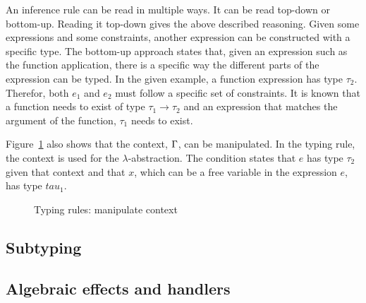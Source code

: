 An inference rule can be read in multiple ways. It can be read top-down or bottom-up. Reading it top-down gives the above described reasoning. Given some expressions and some constraints, another expression can be constructed with a specific type. The bottom-up approach states that, given an expression such as the function application, there is a specific way the different parts of the expression can be typed. In the given example, a function expression has type $\tau_2$. Therefor, both $e_1$ and $e_2$ must follow a specific set of constraints. It is known that a function needs to exist of type $\tau_1 \to \tau_2$ and an expression that matches the argument of the function, $\tau_1$ needs to exist.

Figure~\ref{fig:context} also shows that the context, $\ctx$, can be manipulated. In the typing rule, the context is used for the $\lambda$-abstraction. The condition states that $e$ has type $\tau_2$ given that context and that $x$, which can be a free variable in the expression $e$, has type $tau_1$. 

\begin{figure}[!htb]
\begin{center}
\begin{minipage}{0.95\columnwidth}
\begin{mathpar}
\end{mathpar}
\end{minipage}
\end{center}
\caption{Typing rules: manipulate context}\label{fig:context}
\end{figure}

\subsection{Subtyping}


\subsection{Algebraic effects and handlers}